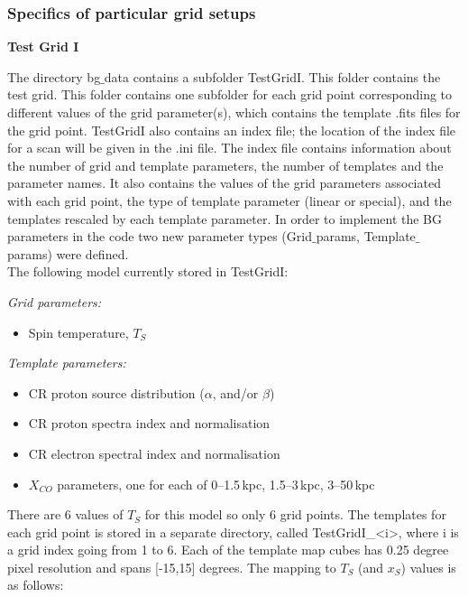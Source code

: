 \documentclass{article}
\begin{document}
\subsubsection{Specifics of particular grid setups}

   {\bf Test Grid I }
   
   The directory bg$\_$data contains a subfolder TestGridI. This folder contains the test grid. This folder contains one subfolder for each grid point corresponding to different values of the grid parameter(s), which contains the template .fits files for the grid point. TestGridI also contains an index file; the location of the index file for a scan will be given in the .ini file. The index file contains information about the number of grid and template parameters, the number of templates and the parameter names. It also contains the values of the grid parameters associated with each grid point, the type of template parameter (linear or special), and the templates rescaled by each template parameter. In order to implement the BG parameters in the code two new parameter types (Grid$\_$params, Template$\_$params) were defined. \\

The following model currently stored in TestGridI:

   {\em Grid parameters:}
   \begin{itemize}
      \item Spin temperature, $T_S$
   \end{itemize}
   
   {\em Template parameters:}
   \begin{itemize}
      \item CR proton source distribution ($\alpha$, and/or $\beta$)
      \item CR proton spectra index and normalisation
      \item CR electron spectral index and normalisation
      \item $X_{CO}$ parameters, one for each of 0--1.5\,kpc, 1.5--3\,kpc, 3--50\,kpc
   \end{itemize}

   There are 6 values of $T_S$ for this model so only 6 grid points.  The
   templates for each grid point is stored in a separate directory, called
   TestGridI\_<i>, where i is a grid index going from 1 to 6. Each of the template map cubes has 0.25 degree pixel resolution and spans [-15,15] degrees. The mapping to  $T_S$ (and $x_{S}$) values is as follows: \\
  
\end{document}
